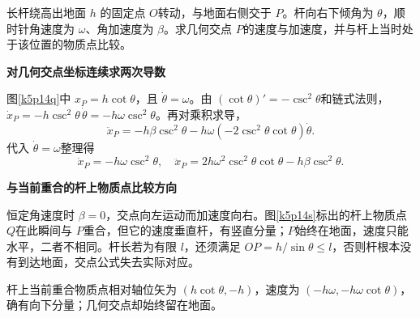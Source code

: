 \begin{question}\begin{example}[转杆与地面的交点]\label{k5p14}
长杆绕高出地面 $h$ 的固定点 $O$转动，与地面右侧交于 $P$。杆向右下倾角为 $\theta$，顺时针角速度为 $\omega$、角加速度为 $\beta$。求几何交点 $P$的速度与加速度，并与杆上当时处于该位置的物质点比较。\end{example}
\end{question}
\begin{solution}\textbf{对几何交点坐标连续求两次导数}\par\nobreak
图\ref{k5p14q}中 $x_P=h\cot\theta$，且 $\dot\theta=\omega$。由 $(\cot\theta)'=-\csc^2\theta$和链式法则，$\dot x_P=-h\csc^2\theta\,\dot\theta=-h\omega\csc^2\theta$。再对乘积求导，
\[\ddot x_P=-h\beta\csc^2\theta
 -h\omega(-2\csc^2\theta\cot\theta)\dot\theta.\]
代入 $\dot\theta=\omega$整理得
\[\boxed{\dot x_P=-h\omega\csc^2\theta},\quad
\boxed{\ddot x_P=2h\omega^2\csc^2\theta\cot\theta-h\beta\csc^2\theta}.\]



\par\medskip{}\noindent\textbf{与当前重合的杆上物质点比较方向}\par\nobreak
恒定角速度时 $\beta=0$，交点向左运动而加速度向右。图\ref{k5p14s}标出的杆上物质点 $Q$在此瞬间与 $P$重合，但它的速度垂直杆，有竖直分量；$P$始终在地面，速度只能水平，二者不相同。杆长若为有限 $l$，还须满足 $OP=h/\sin\theta\le l$，否则杆根本没有到达地面，交点公式失去实际对应。

杆上当前重合物质点相对轴位矢为 $(h\cot\theta,-h)$，速度为 $(-h\omega,-h\omega\cot\theta)$，确有向下分量；几何交点却始终留在地面。\end{solution}

